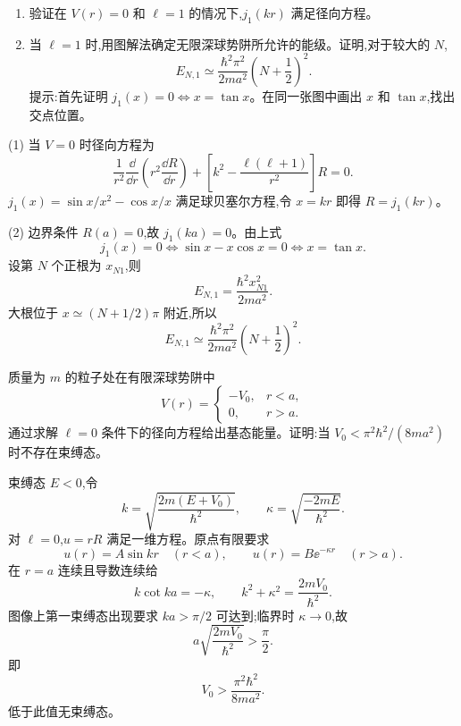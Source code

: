\begin{question}
\begin{enumerate}
\item 验证在 $V(r)=0$ 和 $\ell=1$ 的情况下,$j_1(kr)$ 满足径向方程。
\item 当 $\ell=1$ 时,用图解法确定无限深球势阱所允许的能级。证明,对于较大的 $N$,
\[
E_{N,1}\simeq \frac{\hbar^2\pi^2}{2ma^2}\left(N+\frac12\right)^2.
\]
提示:首先证明 $j_1(x)=0 \Leftrightarrow x=\tan x$。在同一张图中画出 $x$ 和 $\tan x$,找出交点位置。
\end{enumerate}
\begin{solution}

(1) 当 $V=0$ 时径向方程为
\[
\frac{1}{r^2}\frac{\dd}{\dd r}\left(r^2\frac{\dd R}{\dd r}\right)+\left[k^2-\frac{\ell(\ell+1)}{r^2}\right]R=0.
\]
$j_1(x)=\sin x/x^2-\cos x/x$ 满足球贝塞尔方程,令 $x=kr$ 即得 $R=j_1(kr)$。

(2) 边界条件 $R(a)=0$,故 $j_1(ka)=0$。由上式
\[
j_1(x)=0\iff \sin x-x\cos x=0\iff x=\tan x.
\]
设第 $N$ 个正根为 $x_{N1}$,则
\[
E_{N,1}=\frac{\hbar^2x_{N1}^2}{2ma^2}.
\]
大根位于 $x\simeq (N+1/2)\pi$ 附近,所以
\[
E_{N,1}\simeq\frac{\hbar^2\pi^2}{2ma^2}\left(N+\frac12\right)^2.
\]

\end{solution}
\end{question}

\begin{question}
质量为 $m$ 的粒子处在有限深球势阱中
\[
V(r)=\begin{cases}
-V_0, & r<a,\\
0, & r>a.
\end{cases}
\]
通过求解 $\ell=0$ 条件下的径向方程给出基态能量。证明:当 $V_0<\pi^2\hbar^2/(8ma^2)$ 时不存在束缚态。
\begin{solution}

束缚态 $E<0$,令
\[
k=\sqrt{\frac{2m(E+V_0)}{\hbar^2}},\qquad \kappa=\sqrt{\frac{-2mE}{\hbar^2}}.
\]
对 $\ell=0$,$u=rR$ 满足一维方程。原点有限要求
\[
u(r)=A\sin kr\quad (r<a),
\qquad u(r)=B\ee^{-\kappa r}\quad (r>a).
\]
在 $r=a$ 连续且导数连续给
\[
k\cot ka=-\kappa,
\qquad k^2+\kappa^2=\frac{2mV_0}{\hbar^2}.
\]
图像上第一束缚态出现要求 $ka>\pi/2$ 可达到;临界时 $\kappa\to0$,故
\[
a\sqrt{\frac{2mV_0}{\hbar^2}}>\frac{\pi}{2}.
\]
即
\[
V_0>\frac{\pi^2\hbar^2}{8ma^2}.
\]
低于此值无束缚态。

\end{solution}
\end{question}

